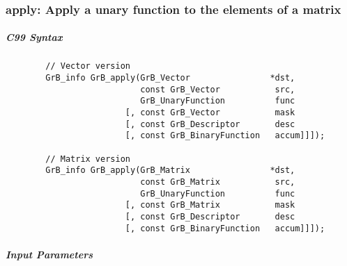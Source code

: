 \subsubsection{{\sf apply}: Apply a unary function to the elements of a matrix}


\subparagraph{C99 Syntax}

\begin{verbatim}
        // Vector version
        GrB_info GrB_apply(GrB_Vector                *dst,
                           const GrB_Vector           src,
                           GrB_UnaryFunction          func
                        [, const GrB_Vector           mask
                        [, const GrB_Descriptor       desc
                        [, const GrB_BinaryFunction   accum]]]);

        // Matrix version
        GrB_info GrB_apply(GrB_Matrix                *dst,
                           const GrB_Matrix           src,
                           GrB_UnaryFunction          func
                        [, const GrB_Matrix           mask
                        [, const GrB_Descriptor       desc
                        [, const GrB_BinaryFunction   accum]]]);
\end{verbatim}

\subparagraph{Input Parameters}

